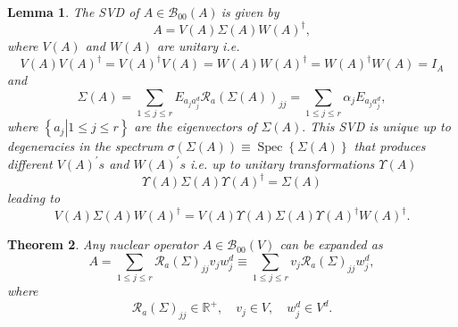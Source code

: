 \documentclass[aps,preprint]{revtex4}%
\newtheorem{theorem}{Theorem}
\newtheorem{lemma}[theorem]{Lemma}
\begin{document}
\begin{lemma}
The SVD of $A\in\mathcal{B}_{00}\left(  A\right)  \ $is given by
\begin{equation}
A=V\left(  A\right)  \Sigma\left(  A\right)  W\left(  A\right)  ^{\dagger},
\end{equation}
where $V\left(  A\right)  $ and $W\left(  A\right)  $ are unitary i.e.
\begin{equation}
V\left(  A\right)  V\left(  A\right)  ^{\dagger}=V\left(  A\right)  ^{\dagger
}V\left(  A\right)  =W\left(  A\right)  W\left(  A\right)  ^{\dagger}=W\left(
A\right)  ^{\dagger}W\left(  A\right)  =I_{A}%
\end{equation}
and
\begin{equation}
\Sigma\left(  A\right)  =\sum_{1\leq j\leq r}E_{a_{j}a_{j}^{d}}\mathcal{R}%
_{a}\left(  \Sigma\left(  A\right)  \right)  _{jj}=\sum_{1\leq j\leq r}%
\alpha_{j}E_{a_{j}a_{j}^{d}},
\end{equation}
where $\left\{  \left.  a_{j}\right\vert 1\leq j\leq r\right\}  $ are the
eigenvectors of $\Sigma\left(  A\right)  .$ This SVD is unique up to
degeneracies in the spectrum $\sigma\left(  \Sigma\left(  A\right)  \right)
\equiv\operatorname*{Spec}\left\{  \Sigma\left(  A\right)  \right\}  $ that
produces different $V\left(  A\right)  ^{\prime}s$ and $W\left(  A\right)
^{\prime}s$ i.e. up to unitary transformations $\Upsilon\left(  A\right)  $
\begin{equation}
\Upsilon\left(  A\right)  \Sigma\left(  A\right)  \Upsilon\left(  A\right)
^{\dagger}=\Sigma\left(  A\right)
\end{equation}
leading to
\begin{equation}
V\left(  A\right)  \Sigma\left(  A\right)  W\left(  A\right)  ^{\dagger
}=V\left(  A\right)  \Upsilon\left(  A\right)  \Sigma\left(  A\right)
\Upsilon\left(  A\right)  ^{\dagger}W\left(  A\right)  ^{\dagger}.
\end{equation}

\end{lemma}

\begin{theorem}
Any nuclear operator $A\in\mathcal{B}_{00}\left(  V\right)  $ can be expanded
as
\begin{equation}
A=\sum_{1\leq j\leq r}\mathcal{R}_{a}\left(  \Sigma\right)  _{jj}v_{j}%
w_{j}^{d}\equiv\sum_{1\leq j\leq r}v_{j}\mathcal{R}_{a}\left(  \Sigma\right)
_{jj}w_{j}^{d},
\end{equation}
where
\begin{equation}
\mathcal{R}_{a}\left(  \Sigma\right)  _{jj}\in\mathbb{R}^{+},\quad v_{j}\in
V,\quad w_{j}^{d}\in V^{d}.
\end{equation}

\end{theorem}
\end{document}
